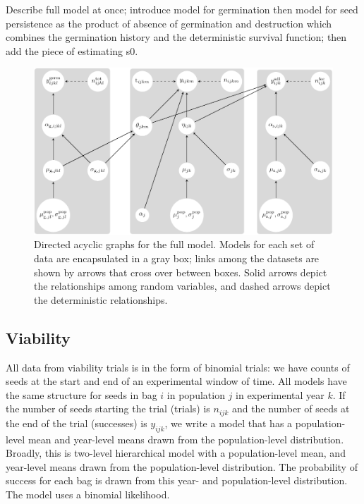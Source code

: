 \documentclass[12pt, oneside, titlepage]{article}   	%
\begin{document}
Describe full model at once; introduce model for germination then model for seed persistence as the product of absence of germination and destruction which combines the germination history and the deterministic survival function; then add the piece of estimating s0.

\begin{figure}[!h]
       \includegraphics[width=\textwidth]{../../manuscript/figures/dag-seed-bag.pdf}  
    \caption{ Directed acyclic graphs for the full model. Models for each set of data are encapsulated in a gray box; links among the datasets are shown by arrows that cross over between boxes. Solid arrows depict the relationships among random variables, and dashed arrows depict the deterministic relationships. }
 \label{fig:dag-seed-bag}
\end{figure}

\subsection{Viability}

All data from viability trials is in the form of binomial trials: we have counts of seeds at the start and end of an experimental window of time. All models have the same structure for seeds in bag $i$ in population $j$ in experimental year $k$. If the number of seeds starting the trial (trials) is $n_{ijk}$ and the number of seeds at the end of the trial (successes) is $y_{ijk}$, we write a model that has a population-level mean and year-level means drawn from the population-level distribution. Broadly, this is two-level hierarchical model with a population-level mean, and year-level means drawn from the population-level distribution. The probability of success for each bag is drawn from this year- and population-level distribution. The model uses a binomial likelihood. 
\end{document}
